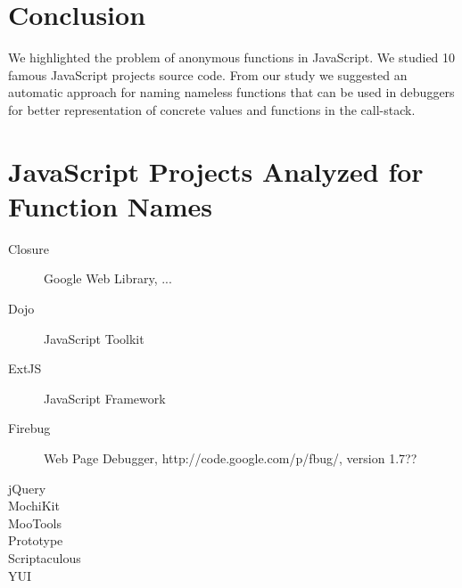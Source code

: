 \documentclass[10pt, preprint]{sigplanconf}
\begin{document}
{%

\section{Conclusion}
We highlighted the problem of anonymous functions in JavaScript. We studied 10 famous JavaScript projects source code. From
our study we suggested an automatic approach for naming nameless functions that can be used in debuggers for better representation of concrete
values and functions in the call-stack.


\appendix
\section{JavaScript Projects Analyzed for Function Names}
\begin{description}
\item[Closure] Google Web Library, ...
\item[Dojo] JavaScript Toolkit
\item[ExtJS] JavaScript Framework
\item[Firebug] Web Page Debugger, http://code.google.com/p/fbug/, version 1.7??
\item[jQuery]
\item[MochiKit]
\item[MooTools]
\item[Prototype]
\item[Scriptaculous]
\item[YUI]
\end{description}






%

}
\end{document}
